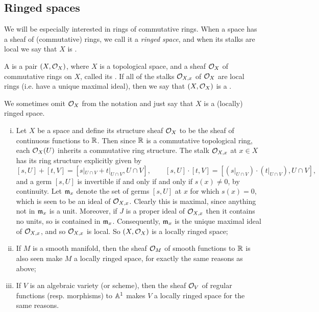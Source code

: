 \subsection{Ringed spaces}
\label{subsec:A_4_ringed_spaces} %
We will be especially interested in rings of commutative rings. When a space has a sheaf of (commutative) rings, we call it a \emph{ringed space}, and when its stalks are local we say that $X$ is .
\begin{defn}
	A  is a pair $(X, \mathcal{O}_X)$, where $X$ is a topological space, and a sheaf $\mathcal{O}_X$ of commutative rings on $X$, called its . If all of the stalks $\mathcal{O}_{X,x}$ of $\mathcal{O}_X$ are local rings (i.e. have a unique maximal ideal), then we say that $(X, \mathcal{O}_X)$ is a . 
\end{defn}

We sometimes omit $\mathcal{O}_X$ from the notation and just say that $X$ is a (locally) ringed space.

\begin{eg}
	\begin{enumerate}[(i)]
		\item Let $X$ be a space and define its structure sheaf $\mathcal{O}_X$ to be the sheaf of continuous functions to $\mathbb{R}$. Then since $\mathbb{R}$ is a commutative topological ring, each $\mathcal{O}_X(U)$ inherits a commutative ring structure. The stalk $\mathcal{O}_{X,x}$ at $x \in X$ has its ring structure explicitly given by
			\[
				[s, U] + [t, V] = [s|_{U\cap V}+t|_{U\cap V}, U \cap V], \qquad [s, U]\cdot [t,V] = [(s|_{U\cap V})\cdot(t|_{U\cap V}), U \cap V],
			\]
			and a germ $[s,U]$ is invertible if and only if and only if $s(x) \neq 0$, by continuity. Let $\mathfrak{m}_x$ denote the set of germs $[s,U]$ at $x$ for which $s(x)=0$, which is seen to be an ideal of $\mathcal{O}_{X,x}$. Clearly this is maximal, since anything not in $\mathfrak{m}_x$ is a unit. Moreover, if $J$ is a proper ideal of $\mathcal{O}_{X,x}$ then it contains no units, so is contained in $\mathfrak{m}_x$. Consequently, $\mathfrak{m}_x$ is the unique maximal ideal of $\mathcal{O}_{X,x}$, and so $\mathcal{O}_{X,x}$ is local. So $(X, \mathcal{O}_X)$ is a locally ringed space;
		\item If $M$ is a smooth manifold, then the sheaf $\mathcal{O}_M$ of smooth functions to $\mathbb{R}$ is also seen make $M$ a locally ringed space, for exactly the same reasons as above;
		\item If $V$ is an algebraic variety (or scheme), then the sheaf $\mathcal{O}_V$ of regular functions (resp. morphisms) to $\mathbb{A}^1$ makes $V$ a locally ringed space for the same reasons.
	\end{enumerate}
\end{eg}

